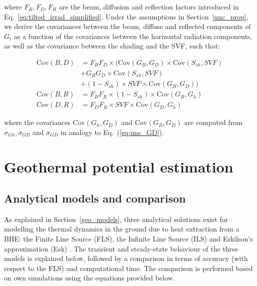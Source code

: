 where $F_{B}, F_{D}, F_{R}$ are the beam, diffusion and reflection factors introduced in Eq.~\ref{eq:tilted_irrad_simplified}. 
Under the assumptions in Section~\ref{unc_prop}, we derive the covariances between the beam, diffuse and reflected components of $G_t$ as a function of the covariances between the horizontal radiation components, as well as the covariance between the shading and the SVF, such that:

\begin{equation}
\begin{aligned}
\mathrm{Cov}(B, D) & = F_{B}  F_{D} \times (\mathrm{Cov}(G_B, G_D) \times \mathrm{Cov}(S_{sh}, \mathit{SVF}) \\
& + G_B  G_D \times \mathrm{Cov}(S_{sh}, \mathit{SVF}) \\
& + (1-S_{sh}) \times \mathit{SVF} \times \mathrm{Cov}(G_B, G_D)) \\
\mathrm{Cov}(B, R) & = F_{B}  F_{R} \times (1-S_{sh}) \times \mathrm{Cov}(G_B, G_h) \\
\mathrm{Cov}(D, R) & = F_{D}  F_{R} \times \mathit{SVF}  \times      \mathrm{Cov}(G_D, G_h) 
\end{aligned}
\end{equation}

where the covariances $\mathrm{Cov}(G_h, G_D)$ and $\mathrm{Cov}(G_B, G_D)$ are computed from $\sigma_{Gh}, \sigma_{GB}$ and $\sigma_{GD}$ in analogy to Eq.~(\ref{eq:unc_GD}).


\chapter{Geothermal potential estimation}

\section{Analytical models and comparison}
\label{app:allModels}

As explained in Section~\ref{geo_models}, three analytical solutions exist for modelling the thermal dynamics in the ground due to heat extraction from a BHE: the Finite Line Source (FLS), the Infinite Line Source (ILS) and Eskilson's approximation (Esk) \cite{pahud_geothermal_2002}. The transient and steady-state behaviour of the three models is explained below, followed by a comparison in terms of accuracy (with respect to the FLS) and computational time. The comparison is performed based on own simulations using the equations provided below.

